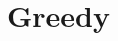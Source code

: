\documentclass{beamer}
\begin{document}


% 
% 
% 
% 
% 
% 
% 
% 
% 
% 
% 

\section{Greedy}


\end{document}
